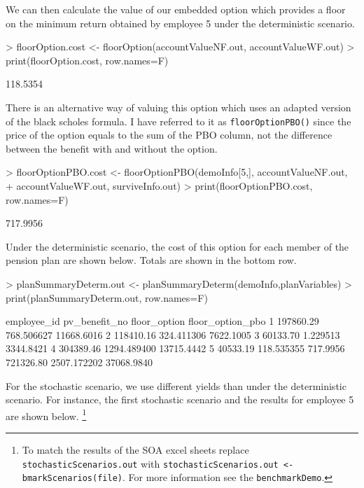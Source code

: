 \documentclass[12pt]{article}
\begin{document}
We can then calculate the value of our embedded option which provides 
a floor on the minimum return obtained by employee 5 under the deterministic 
scenario.
\begin{Schunk}
\begin{Sinput}
> floorOption.cost <- floorOption(accountValueNF.out, accountValueWF.out)
> print(floorOption.cost, row.names=F)
\end{Sinput}
\begin{Soutput}
[1] 118.5354
\end{Soutput}
\end{Schunk}

There is an alternative way of valuing this option which uses an adapted version
of the black scholes formula. I have referred to it as \texttt{floorOptionPBO()}
since the price of the option equals to the sum of the PBO column, not the difference
between the benefit with and without the option.

\begin{Schunk}
\begin{Sinput}
> floorOptionPBO.cost <- floorOptionPBO(demoInfo[5,], accountValueNF.out, 
+   accountValueWF.out, surviveInfo.out)
> print(floorOptionPBO.cost, row.names=F)
\end{Sinput}
\begin{Soutput}
[1] 717.9956
\end{Soutput}
\end{Schunk}

Under the deterministic scenario, the cost of this option for each 
member of the pension plan are shown below. Totals are shown in the 
bottom row.

\begin{Schunk}
\begin{Sinput}
> planSummaryDeterm.out <- planSummaryDeterm(demoInfo,planVariables)
> print(planSummaryDeterm.out, row.names=F)
\end{Sinput}
\begin{Soutput}
 employee_id pv_benefit_no floor_option floor_option_pbo
           1     197860.29   768.506627       11668.6016
           2     118410.16   324.411306        7622.1005
           3      60133.70     1.229513        3344.8421
           4     304389.46  1294.489400       13715.4442
           5      40533.19   118.535355         717.9956
                 721326.80  2507.172202       37068.9840
\end{Soutput}
\end{Schunk}

For the stochastic scenario, we use different yields than under
the deterministic scenario. For instance, the first stochastic scenario
and the results for employee 5 are shown below. \footnote{To match the results of the
SOA excel sheets replace \texttt{stochasticScenarios.out} with \texttt{stochasticScenarios.out <- bmarkScenarios(file)}.
For more information see the \texttt{benchmarkDemo}.}
\end{document}

